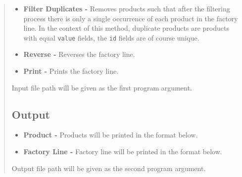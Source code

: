 \documentclass[10pt]{article}
\begin{document}
\begin{quote}
\begin{itemize}
    \item \textbf{Filter Duplicates - } Removes products such that after the filtering process there is only a single occurrence of each product in the factory line. In the context of this method, duplicate products are products with equal \texttt{value} fields, the \texttt{id} fields are of course unique. \hfill \\ [10pt]
    \vspace{7pt}

    \item \textbf{Reverse - } Reverses the factory line. \hfill \\ [10pt]
    \vspace{7pt}
    
    \item \textbf{Print - } Prints the factory line. \hfill \\ [10pt]
    \vspace{7pt}
    
\end{itemize}

Input file path will be given as the first program argument.

\subsection{Output}

\begin{itemize}
    \item \textbf{Product - } Products will be printed in the format below. \\ [10pt]
    \vspace{7pt}
    
    \item \textbf{Factory Line - } Factory line will be printed in the format below. \\ [10pt]
    \vspace{7pt}
    
\end{itemize}
\vspace{-5pt}
Output file path will be given as the second program argument.

\end{quote}
\end{document}
